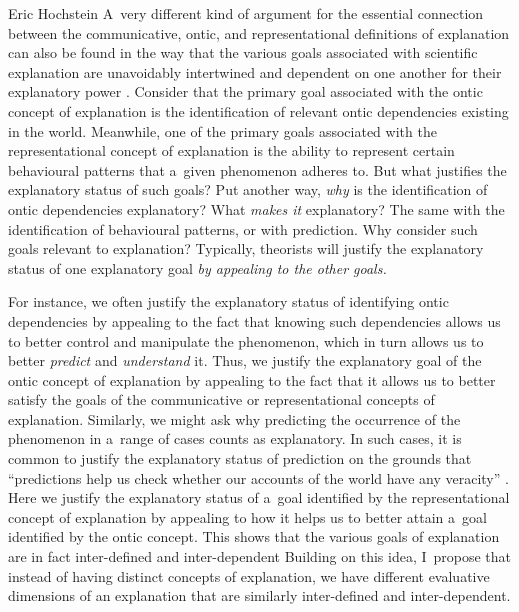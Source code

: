 \begin{artengenv}{Eric Hochstein}
A~very different kind of argument for the essential connection between the communicative, ontic, and representational definitions of explanation can also be found in the way that the various goals associated with scientific explanation are unavoidably intertwined and dependent on one another for their explanatory power
\parencite[][]{hochstein_why_2017}. %
 Consider that the primary goal associated with the ontic concept of explanation is the identification of relevant ontic dependencies existing in the world. Meanwhile, one of the primary goals associated with the representational concept of explanation is the ability to represent certain behavioural patterns that a~given phenomenon adheres to. But what justifies the explanatory status of such goals? Put another way, \textit{why} is the identification of ontic dependencies explanatory? What \textit{makes it} explanatory? The same with the identification of behavioural patterns, or with prediction. Why consider such goals relevant to explanation? Typically, theorists will justify the explanatory status of one explanatory goal \textit{by appealing to the other goals.}

For instance, we often justify the explanatory status of identifying ontic dependencies by appealing to the fact that knowing such dependencies allows us to better control and manipulate the phenomenon, which in turn allows us to better \textit{predict} and \textit{understand} it. Thus, we justify the explanatory goal of the ontic concept of explanation by appealing to the fact that it allows us to better satisfy the goals of the communicative or representational concepts of explanation. Similarly, we might ask why predicting the occurrence of the phenomenon in a~range of cases counts as explanatory. In such cases, it is common to justify the explanatory status of prediction on the grounds that ``predictions help us check whether our accounts of the world have any veracity''
\parencite[][p.453]{douglas_reintroducing_2009}. %
 Here we justify the explanatory status of a~goal identified by the representational concept of explanation by appealing to how it helps us to better attain a~goal identified by the ontic concept. This shows that the various goals of explanation are in fact inter-defined and inter-dependent 
 Building on this idea, I~propose that instead of having distinct concepts of explanation, we have different evaluative dimensions of an explanation that are similarly inter-defined and inter-dependent.


\end{artengenv}
